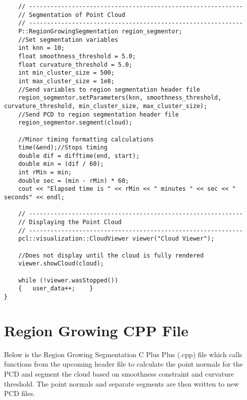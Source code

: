 \begin{lstlisting}
	// ------------------------------------------------------------
	// Segmentation of Point Cloud
	// ------------------------------------------------------------
	P::RegionGrowingSegmentation region_segmentor;
	//Set segmentation variables
	int knn = 10;
	float smoothness_threshold = 5.0;
	float curvature_threshold = 5.0;
	int min_cluster_size = 500;
	int max_cluster_size = 1e8;
	//Send variables to region segmentation header file
	region_segmentor.setParameters(knn, smoothness_threshold, curvature_threshold, min_cluster_size, max_cluster_size);
	//Send PCD to region segmentation header file
	region_segmentor.segment(cloud);

	//Minor timing formatting calculations
	time(&end);//Stops timing
	double dif = difftime(end, start);
	double min = (dif / 60);
	int rMin = min;
	double sec = (min - rMin) * 60;
	cout << "Elapsed time is " << rMin << " minutes " << sec << " seconds" << endl;

	// ------------------------------------------------------------
	// Displaying the Point Cloud
	// ------------------------------------------------------------
	pcl::visualization::CloudViewer viewer("Cloud Viewer");

	//Does not display until the cloud is fully rendered
	viewer.showCloud(cloud);

	while (!viewer.wasStopped())
	{	user_data++;	}
}
\end{lstlisting}
\section{Region Growing CPP File}
Below is the Region Growing Segmentation C Plus Plus (.cpp) file which calls functions from the upcoming header file to calculate the point normals for the PCD and segment the cloud based on smoothness constraint and curvature threshold. The point normals and separate segments are then written to new PCD files. 

